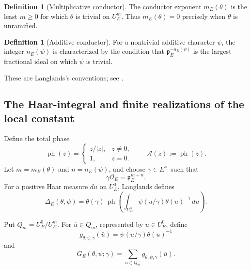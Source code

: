\documentclass[11pt]{amsart}
\theoremstyle{definition}
\newtheorem{definition}[theorem]{Definition}
\theoremstyle{remark}
\newcommand{\cO}{\mathcal O}
\newcommand{\p}{\mathfrak p}
\newcommand{\ph}{\operatorname{ph}}
\newcommand{\Aphase}{\mathcal A}
\begin{document}
\begin{definition}[Multiplicative conductor]
The conductor exponent $m_E(\theta)$ is the least $m\ge0$ for which
$\theta$ is trivial on $U_E^m$.  Thus $m_E(\theta)=0$ precisely when
$\theta$ is unramified.
\end{definition}

\begin{definition}[Additive conductor]
For a nontrivial additive character $\psi$, the integer $n_E(\psi)$
is characterized by the condition that $\p_E^{-n_E(\psi)}$ is the
largest fractional ideal on which $\psi$ is trivial.
\end{definition}

These are Langlands's conventions; see \cite[p.~5]{Langlands}.

\subsection{The Haar-integral and finite realizations of the local constant}

Define the total phase
\[
 \ph(z)=
 \begin{cases}
 z/|z|,&z\ne0,\\
 1,&z=0.
 \end{cases}
 \qquad
 \Aphase(z):=\ph(z).
\]
Let $m=m_E(\theta)$ and $n=n_E(\psi)$, and choose
$\gamma\in E^\times$ such that
\begin{equation}\label{eq:admissible-gamma}
 \gamma\cO_E=\p_E^{m+n}.
\end{equation}
For a positive Haar measure $du$ on $U_E^0$, Langlands defines
\begin{equation}\label{eq:def-delta}
 \Delta_E(\theta,\psi)
 =\theta(\gamma)\,
  \ph\left(\int_{U_E^0}
      \psi(u/\gamma)\theta(u)^{-1}\,du\right).
\end{equation}

Put $Q_m=U_E^0/U_E^m$.  For $\bar u\in Q_m$, represented by
$u\in U_E^0$, define
\begin{equation}\label{eq:finite-local-gauss-summand}
 g_{\theta,\psi,\gamma}(\bar u)
 =\psi(u/\gamma)\theta(u)^{-1}
\end{equation}
and
\begin{equation}\label{eq:finite-local-gauss-sum}
 G_E(\theta,\psi;\gamma)
 =\sum_{\bar u\in Q_m}
   g_{\theta,\psi,\gamma}(\bar u).
\end{equation}
\end{document}
